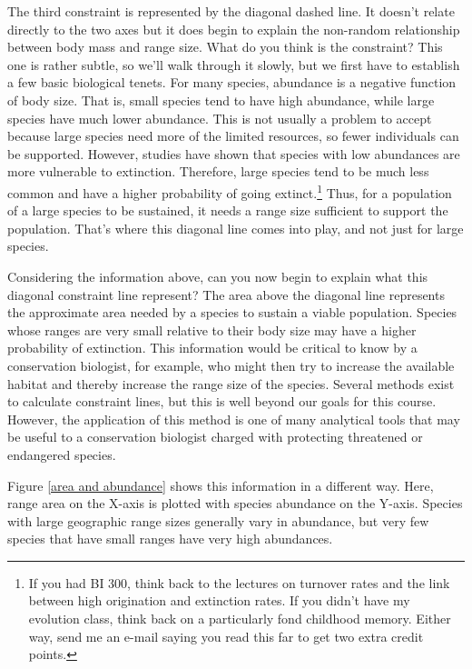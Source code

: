 \documentclass[12pt, oneside]{article}   	%
\begin{document}
The third constraint is represented by the diagonal dashed line.  It doesn't relate directly to the two axes but it does begin to explain the non-random relationship between body mass and range size. What do you think is the constraint? This one is rather subtle, so we'll walk through it slowly, but we first have to establish a few basic biological tenets.  For many species, abundance is a negative function of body size.  That is, small species tend to have high abundance, while large species have much lower abundance.  This is not usually a problem to accept because large species need more of the limited resources, so fewer individuals can be supported.  However, studies have shown that species with low abundances are more vulnerable to extinction.  Therefore, large species tend to be much less common and have a higher probability of going extinct.\footnote{If you had BI 300, think back to the lectures on turnover rates and the link between high origination and extinction rates.  If you didn't have my evolution class, think back on a particularly fond childhood memory.  Either way, send me an e-mail saying you read this far to get two extra credit points.}  Thus, for a population of a large species to be sustained, it needs a range size sufficient to support the population.  That's where this diagonal line comes into play, and not just for large species. 
 
Considering the information above, can you now begin to explain what this diagonal constraint line represent?  The area above the diagonal line represents the approximate area needed by a species to sustain a viable population.  Species whose ranges are very small relative to their body size may have a higher probability of extinction.  This information would be critical to know by a conservation biologist, for example, who might then try to increase the available habitat and thereby increase the range size of the species.  Several methods exist to calculate constraint lines, but this is well beyond our goals for this course.  However, the application of this method is one of many analytical tools that may be useful to a conservation biologist charged with protecting threatened or endangered species.

Figure \ref{area and abundance} shows this information in a different way.  Here, range area on the X-axis is plotted with species abundance on the Y-axis.  Species with large geographic range sizes generally vary in abundance, but very few species that have small ranges have very high abundances.
\end{document}
